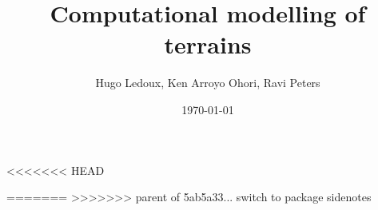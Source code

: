 \documentclass[a4paper,10pt,parskip=half]{scrbook}
\title{Computational modelling of terrains}
\author{Hugo Ledoux, Ken Arroyo Ohori, Ravi Peters}
\date{\today}
\begin{document}
\frontmatter
\maketitle
\tableofcontents


\mainmatter


<<<<<<< HEAD





=======
% 
% 
% 
% 
% 
>>>>>>> parent of 5ab5a33... switch to package sidenotes


\backmatter 
 

\end{document}
